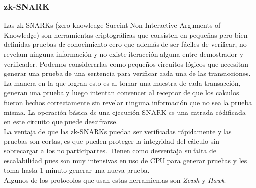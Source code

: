 \documentclass[oneside,10pt]{article}
\begin{document}
\subsubsection{zk-SNARK}
Las zk-SNARKs\cite{samman} (zero knowledge Succint Non-Interactive Arguments of Knowledge) son herramientas criptográficas que consisten en pequeñas pero bien definidas pruebas de conocimiento cero que además de ser fáciles de verificar, no revelam ninguna información y no existe iteracción alguna entre demostrador y verificador. Podemos considerarlas como pequeños circuitos lógicos que necesitan generar una prueba de una sentencia para verificar cada una de las transacciones. La manera en la que logran esto es al tomar una muestra de cada transacción, generan una prueba y luego intentan convencer al receptor de que los calculos fueron hechos correctamente sin revelar ninguna información que no sea la prueba misma. La operación básica de una ejecución SNARK es una entrada códificada en este circuito que puede descifrarse.\\
La ventaja de que las zk-SNARKs puedan ser verificadas rápidamente y las pruebas son cortas, es que pueden proteger la integridad del cálculo sin sobrecargar a los no participantes. Tienen como desventaja su falta de escalabilidad pues son muy intensivas en uso de CPU para generar pruebas y les toma hasta 1 minuto generar una nueva prueba.\\
Algunos de los protocolos que usan estas herramientas son \emph{Zcash} y \emph{Hawk}.
\end{document}
